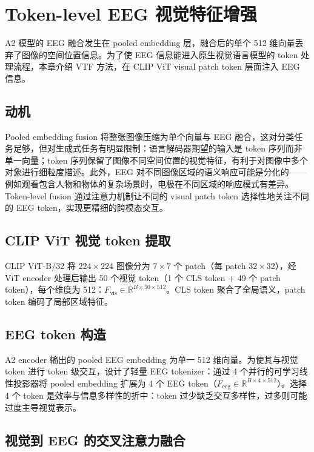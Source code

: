\section{Token-level EEG 视觉特征增强}

A2 模型的 EEG 融合发生在 pooled embedding 层，融合后的单个 512 维向量丢弃了图像的空间位置信息。为了使 EEG 信息能进入原生视觉语言模型的 token 处理流程，本章介绍 VTF 方法，在 CLIP ViT visual patch token 层面注入 EEG 信息。

\subsection{动机}

Pooled embedding fusion 将整张图像压缩为单个向量与 EEG 融合，这对分类任务足够，但对生成式任务有明显限制：语言解码器期望的输入是 token 序列而非单一向量；token 序列保留了图像不同空间位置的视觉特征，有利于对图像中多个对象进行细粒度描述。此外，EEG 对不同图像区域的语义响应可能是分化的——例如观看包含人物和物体的复杂场景时，电极在不同区域的响应模式有差异。Token-level fusion 通过注意力机制让不同的 visual patch token 选择性地关注不同的 EEG token，实现更精细的跨模态交互。

\subsection{CLIP ViT 视觉 token 提取}

CLIP ViT-B/32 将 $224\times224$ 图像分为 $7\times7$ 个 patch（每 patch $32\times32$），经 ViT encoder 处理后输出 50 个视觉 token（1 个 CLS token + 49 个 patch token），每个维度为 512：$F_{\mathrm{vis}} \in \mathbb{R}^{B\times50\times512}$。CLS token 聚合了全局语义，patch token 编码了局部区域特征。

\subsection{EEG token 构造}

A2 encoder 输出的 pooled EEG embedding 为单一 512 维向量。为使其与视觉 token 进行 token 级交互，设计了轻量 EEG tokenizer：通过 4 个并行的可学习线性投影器将 pooled embedding 扩展为 4 个 EEG token（$F_{\mathrm{eeg}} \in \mathbb{R}^{B\times4\times512}$）。选择 4 个 token 是效率与信息多样性的折中：token 过少缺乏交互多样性，过多则可能过度主导视觉表示。

\subsection{视觉到 EEG 的交叉注意力融合}

